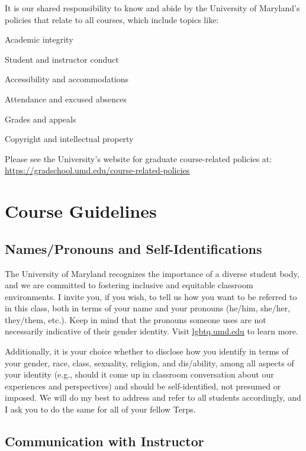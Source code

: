 \documentclass[11pt,usenames,dvipsnames,svgnames,x11names,letterpaper]{article}
\newcommand{\urllink}[2]{\href{#1}{\textcolor{Tomato3}{{{\tiny\faChevronRight}\uline{#2}}}}}
\begin{document}
It is our shared responsibility to know and abide by the University of Maryland's policies that relate to all courses, which include topics like:
\begin{compactitem}
    \item Academic integrity
    \item Student and instructor conduct
    \item Accessibility and accommodations
    \item Attendance and excused absences
    \item Grades and appeals
    \item Copyright and intellectual property
\end{compactitem}
Please see the University's website for graduate course-related policies at:\\ \urllink{https://gradschool.umd.edu/course-related-policies}{https://gradschool.umd.edu/course-related-policies}


\section{Course Guidelines}

\subsection{Names/Pronouns and Self-Identifications}
The University of Maryland recognizes the importance of a diverse student body, and we are committed to fostering inclusive and equitable classroom environments. I invite you, if you wish, to tell us how you want to be referred to in this class, both in terms of your name and your pronouns (he/him, she/her, they/them, etc.). Keep in mind that the pronouns someone uses are not necessarily indicative of their gender identity. Visit \urllink{https://lgbtq.umd.edu/}{lgbtq.umd.edu} to learn more.


Additionally, it is your choice whether to disclose how you identify in terms of your gender, race, class, sexuality, religion, and dis/ability, among all aspects of your identity (e.g., should it come up in classroom conversation about our experiences and perspectives) and should be self-identified, not presumed or imposed. We will do my best to address and refer to all students accordingly, and I ask you to do the same for all of your fellow Terps.

\subsection{Communication with Instructor}
\end{document}

